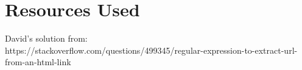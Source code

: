 \documentclass{article}
\begin{document}
\section{Resources Used}
David's solution from:\\
https://stackoverflow.com/questions/499345/regular-expression-to-extract-url-from-an-html-link\\
\end{document}
